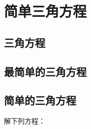 \begin{Exercise}
  \begin{question}
    \item 
    \item 
    \item 
    \item 
    \item 
    \item 
    \item 
    \item 
    \item 
    \item 
    \item 
    \item 
    \item 
  \end{question}
\end{Exercise}

\section{简单三角方程}
\subsection{三角方程}
\subsection{最简单的三角方程}
\begin{Practice}
  \begin{question}
    \item 
    \item 
    \item 
  \end{question}
\end{Practice}
\subsection{简单的三角方程}
\begin{Practice}
  解下列方程：
  \begin{question}
    \item 
    \item 
    \item 
    \item 
    \item 
    \item 
    \item 
    \item 
  \end{question}
\end{Practice}

